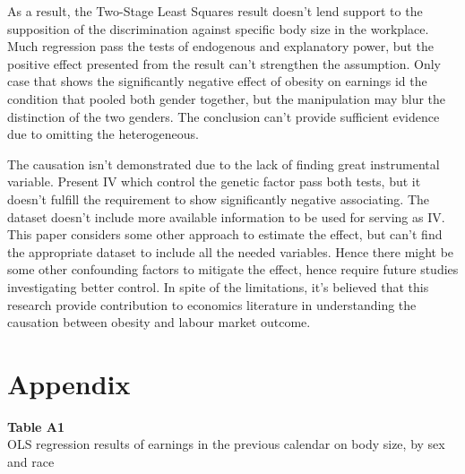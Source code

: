 \documentclass{article}
\begin{document}
\par
\setlength{\parindent}{2em}
As a result, the Two-Stage Least Squares result doesn't lend support to the supposition of the discrimination against specific body size in the workplace. Much regression pass the tests of endogenous and explanatory power, but the positive effect presented from the result can't strengthen the assumption. Only case that shows the significantly negative effect of obesity on earnings id the condition that pooled both gender together, but the manipulation may blur the distinction of the two genders. The conclusion can't provide sufficient evidence due to omitting the heterogeneous. 
\par
\setlength{\parindent}{2em}
The causation isn't demonstrated due to the lack of finding great instrumental variable. Present IV which control the genetic factor pass both tests, but it doesn't fulfill the requirement to show significantly negative associating. The dataset doesn't include more available information to be used for serving as IV. This paper considers some other approach to estimate the effect, but can't find the appropriate dataset to include all the needed variables. Hence there might be some other confounding factors to mitigate the effect, hence require future studies investigating better control. In spite of the limitations, it's believed that this research provide contribution to economics literature in understanding the causation between obesity and labour market outcome.


\newpage


\renewcommand\refname{Reference}




\newpage

\section*{Appendix}

\vspace{20pt}

\noindent
\textbf{Table A1} \\
OLS regression results of earnings in the previous calendar on body size, by sex and race
\end{document}

